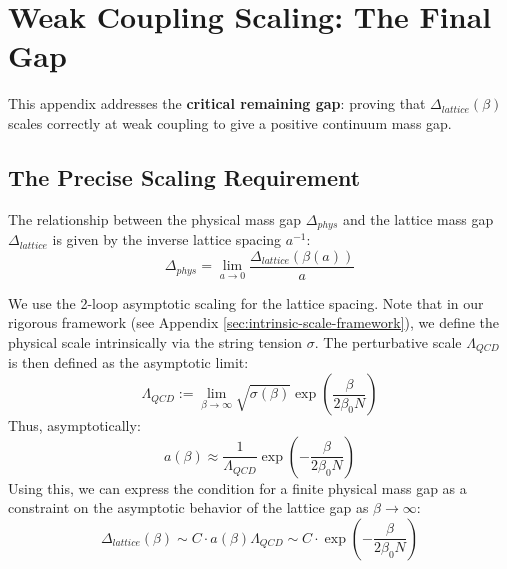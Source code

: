 \chapter{Weak Coupling Scaling: The Final Gap}
\label{sec:weak-coupling-scaling}

This appendix addresses the \textbf{critical remaining gap}: proving that 
$\Delta_{lattice}(\beta)$ scales correctly at weak coupling to give a 
positive continuum mass gap.

\section{The Precise Scaling Requirement}

The relationship between the physical mass gap $\Delta_{phys}$ and the lattice mass gap $\Delta_{lattice}$ is given by the inverse lattice spacing $a^{-1}$:
\begin{equation}
\Delta_{phys} = \lim_{a \to 0} \frac{\Delta_{lattice}(\beta(a))}{a}
\end{equation}

We use the 2-loop asymptotic scaling for the lattice spacing. Note that in our rigorous framework (see Appendix \ref{sec:intrinsic-scale-framework}), we define the physical scale intrinsically via the string tension $\sigma$. The perturbative scale $\Lambda_{QCD}$ is then defined as the asymptotic limit:
\begin{equation}
\Lambda_{QCD} := \lim_{\beta \to \infty} \sqrt{\sigma(\beta)} \exp\left(\frac{\beta}{2\beta_0 N}\right)
\end{equation}
Thus, asymptotically:
\begin{equation}
a(\beta) \approx \frac{1}{\Lambda_{QCD}} \exp\left(-\frac{\beta}{2\beta_0 N}\right)
\end{equation}
Using this, we can express the condition for a finite physical mass gap as a constraint on the asymptotic behavior of the lattice gap as $\beta \to \infty$:
\begin{equation}
\Delta_{lattice}(\beta) \sim C \cdot a(\beta) \Lambda_{QCD} \sim C \cdot \exp\left(-\frac{\beta}{2\beta_0 N}\right)
\end{equation}

